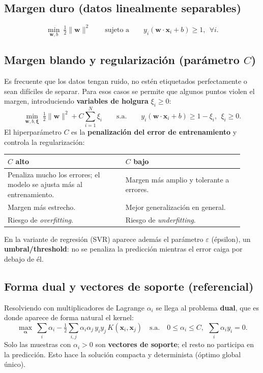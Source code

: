 \documentclass[11pt,a4paper]{article}
\begin{document}
\subsection{Margen duro (datos linealmente separables)}
\begin{equation}
\min_{\mathbf{w},b}\ \tfrac{1}{2}\|\mathbf{w}\|^2
\qquad\text{sujeto a}\qquad y_i(\mathbf{w}\cdot\mathbf{x}_i + b)\ge 1,\ \ \forall i.
\end{equation}

\subsection{Margen blando y regularización (parámetro $C$)}
Es frecuente que los datos tengan ruido, no estén etiquetados perfectamente o sean difíciles de
separar. Para esos casos se permite que algunos puntos violen el margen, introduciendo
\textbf{variables de holgura} $\xi_i \ge 0$:
\begin{equation}
\min_{\mathbf{w},b,\boldsymbol\xi}\ \tfrac{1}{2}\|\mathbf{w}\|^2 + C\sum_{i=1}^{N}\xi_i
\qquad\text{s.a.}\qquad y_i(\mathbf{w}\cdot\mathbf{x}_i + b)\ge 1-\xi_i,\ \ \xi_i\ge 0.
\end{equation}
El hiperparámetro $C$ es la \textbf{penalización del error de entrenamiento} y controla la
regularización:
\begin{center}
\renewcommand{\arraystretch}{1.25}
\begin{tabular}{@{}p{0.46\linewidth}p{0.46\linewidth}@{}}
\toprule
\textcolor{ColPrim}{\textbf{$C$ alto}} & \textcolor{ColSec}{\textbf{$C$ bajo}} \\
\midrule
Penaliza mucho los errores; el modelo se ajusta más al entrenamiento. & Margen más amplio y tolerante a errores. \\
Margen más estrecho. & Mejor generalización en general. \\
Riesgo de \textit{overfitting}. & Riesgo de \textit{underfitting}. \\
\bottomrule
\end{tabular}
\end{center}
En la variante de regresión (SVR) aparece además el parámetro $\varepsilon$ (épsilon), un
\textbf{umbral/threshold}: no se penaliza la predicción mientras el error caiga por debajo de él.

\subsection{Forma dual y vectores de soporte (referencial)}
Resolviendo con multiplicadores de Lagrange $\alpha_i$ se llega al problema \textbf{dual}, que es
donde aparece de forma natural el kernel:
\begin{equation}
\max_{\boldsymbol\alpha}\ \sum_{i}\alpha_i - \tfrac{1}{2}\sum_{i,j}\alpha_i\alpha_j\,y_i y_j\,K(\mathbf{x}_i,\mathbf{x}_j)
\quad\text{s.a.}\quad 0\le\alpha_i\le C,\ \ \sum_i\alpha_i y_i = 0.
\end{equation}
Solo las muestras con $\alpha_i > 0$ son \textbf{vectores de soporte}; el resto no participa en la
predicción. Esto hace la solución compacta y determinista (óptimo global único).
\end{document}

